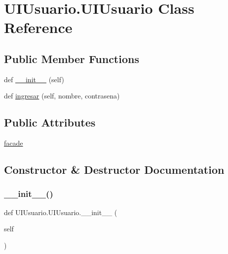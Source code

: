 \hypertarget{class_u_i_usuario_1_1_u_i_usuario}{}\section{U\+I\+Usuario.\+U\+I\+Usuario Class Reference}
\label{class_u_i_usuario_1_1_u_i_usuario}
\subsection*{Public Member Functions}
\begin{DoxyCompactItemize}
\item 
def \mbox{\hyperlink{class_u_i_usuario_1_1_u_i_usuario_a1e65f56af297fce4d5b3ed7613f1d0fa}{\+\_\+\+\_\+init\+\_\+\+\_\+}} (self)
\item 
def \mbox{\hyperlink{class_u_i_usuario_1_1_u_i_usuario_ad83e1ef18f57b281a7708fd8ef0d3da4}{ingresar}} (self, nombre, contrasena)
\end{DoxyCompactItemize}
\subsection*{Public Attributes}
\begin{DoxyCompactItemize}
\item 
\mbox{\hyperlink{class_u_i_usuario_1_1_u_i_usuario_a03b33bc6d21217abcdbaef28c27c24e9}{facade}}
\end{DoxyCompactItemize}


\subsection{Constructor \& Destructor Documentation}
\mbox{\label{class_u_i_usuario_1_1_u_i_usuario_a1e65f56af297fce4d5b3ed7613f1d0fa}} 
\subsubsection{\texorpdfstring{\+\_\+\+\_\+init\+\_\+\+\_\+()}{\_\_init\_\_()}}
{\footnotesize\ttfamily def U\+I\+Usuario.\+U\+I\+Usuario.\+\_\+\+\_\+init\+\_\+\+\_\+ (\begin{DoxyParamCaption}\item[{}]{self }\end{DoxyParamCaption})}



